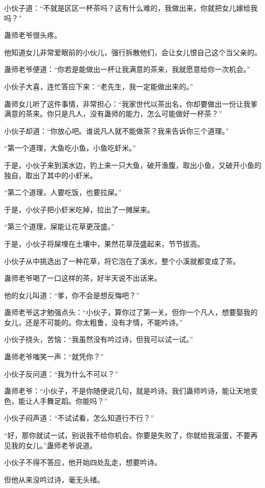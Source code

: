 \begin{this_body}
小伙子道：“不就是区区一杯茶吗？这有什么难的，我做出来，你就把女儿嫁给我吗？”

蛊师老爷很头疼。

他知道女儿非常爱眼前的小伙儿，强行拆散他们，会让女儿恨自己这个当父亲的。

蛊师老爷便道：“你若是能做出一杯让我满意的茶来，我就愿意给你一次机会。”

小伙子大喜，连忙答应下来：“老先生，我一定能做出来的。”

蛊师女儿听了这件事情，非常担心：“我家世代以茶出名，你却要做出一份让我爹满意的茶来。你只是凡人，没有蛊师的能力，怎么可能做好一杯茶？”

小伙子却道：“你放心吧。谁说凡人就不能做茶？我来告诉你三个道理。”

“第一个道理，大鱼吃小鱼，小鱼吃虾米。”

于是，小伙子来到溪水边，钓上来一只大鱼，破开渔腹，取出小鱼，又破开小鱼的独自，取出了其中的小虾米。

“第二个道理，人要吃饭，也要拉屎。”

于是，小伙子把小虾米吃掉，拉出了一摊屎来。

“第三个道理，屎能让花草更茂盛。”

于是，小伙子将屎埋在土壤中，果然花草茂盛起来，节节拔高。

小伙子从中挑选出了一种花草，将它泡在了溪水，整个小溪就都变成了茶。

蛊师老爷喝了一口这样的茶，好半天说不出话来。

他的女儿叫道：“爹，你不会是想反悔吧？”

蛊师老爷这才勉强点头：“小伙子，算你过了第一关。但你一个凡人，想要娶我的女儿，还是不可能的。你太粗鲁，没有才情，不能吟诗。”

小伙子挠头，苦恼：“我虽然没有吟过诗，但我可以试一试。”

蛊师老爷嗤笑一声：“就凭你？”

小伙子反问道：“我为什么不可以？”

蛊师老爷：“小伙子，不是你随便说几句，就是吟诗。我们蛊师吟诗，能让天地变色，能让人手舞足蹈。你能吗？”

小伙子闷声道：“不试试看，怎么知道行不行？”

“好，那你就试一试，别说我不给你机会。你要是失败了，你就给我滚蛋，不要再见我的女儿。”蛊师老爷说道。

小伙子不得不答应，他开始四处乱走，想要吟诗。

但他从来没吟过诗，毫无头绪。


\end{this_body}
